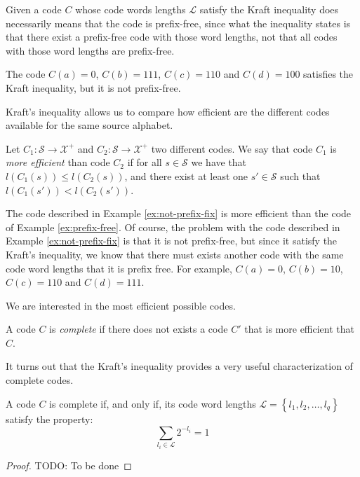 Given a code $C$ whose code words lengths $\mathcal{L}$ satisfy the Kraft inequality does necessarily means that the code is prefix-free, since what the inequality states is that there exist a prefix-free code with those word lengths, not that all codes with those word lengths are prefix-free.

\begin{example}
\label{ex:not-prefix-fix}
The code $C(a)=0$, $C(b)=111$, $C(c)=110$ and $C(d)=100$ satisfies the Kraft inequality, but it is not prefix-free.
\end{example}

Kraft's inequality allows us to compare how efficient are the different codes available for the same source alphabet.

\begin{definition}
Let $C_1:\mathcal{S}\rightarrow\mathcal{X}^{+}$ and $C_2:\mathcal{S}\rightarrow\mathcal{X}^{+}$ two different codes. We say that code $C_1$ is \emph{more efficient} than code $C_2$ if for all $s \in \mathcal{S}$ we have that $l(C_1(s)) \leq l(C_2(s))$, and there exist at least one $s' \in \mathcal{S}$ such that $l(C_1(s')) < l(C_2(s'))$.
\end{definition}

\begin{example}
The code described in Example \ref{ex:not-prefix-fix} is more efficient than the code of Example \ref{ex:prefix-free}. Of course, the problem with the code described in Example \ref{ex:not-prefix-fix} is that it is not prefix-free, but since it satisfy the Kraft's inequality, we know that there must exists another code with the same code word lengths that it is prefix free. For example, $C(a)=0$, $C(b)=10$, $C(c)=110$ and $C(d)=111$.
\end{example}

We are interested in the most efficient possible codes.

\begin{definition}
A code $C$ is \emph{complete} if there does not exists a code $C'$ that is more efficient that $C$.
\end{definition}

It turns out that the Kraft's inequality provides a very useful characterization of complete codes.

\begin{proposition}
A code $C$ is complete if, and only if, its code word lengths $\mathcal{L}=\left\{ l_{1},l_{2},\ldots,l_{q}\right\}$ satisfy the property:
\[
\sum_{l_{i}\in\mathcal{L}}2^{-l_{i}} = 1
\]
\end{proposition}
\begin{proof}
{\color{red} TODO: To be done}
\end{proof}

